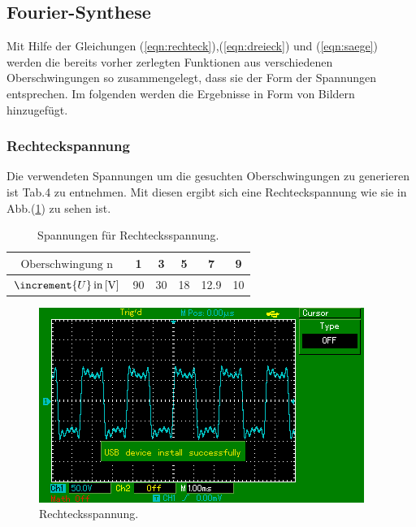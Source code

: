 \subsection{Fourier-Synthese}
Mit Hilfe der Gleichungen (\ref{eqn:rechteck}),(\ref{eqn:dreieck}) und (\ref{eqn:saege})
werden die bereits vorher zerlegten Funktionen aus verschiedenen Oberschwingungen so zusammengelegt,
dass sie der Form der Spannungen entsprechen. Im folgenden werden die Ergebnisse in Form von Bildern hinzugefügt.

\subsubsection{Rechteckspannung}
Die verwendeten Spannungen um die gesuchten Oberschwingungen zu generieren ist Tab.4 zu entnehmen.
Mit diesen ergibt sich eine Rechteckspannung wie sie in Abb.(\ref{fig:recht}) zu sehen ist.
\begin{table}[h]
  \centering
  \label{tab:4}
  \begin{tabular}{ c c c c c c  }
    \toprule
   $ \text{Oberschwingung n} $ & 1 & 3 & 5 & 7 & 9 \\
    \midrule
   $\increment{U} \,\text{in\,[V]}$ &90 & 30 &18 &12.9 & 10 \\
    \bottomrule
  \end{tabular}
  \caption{Spannungen für Rechtecksspannung.}
\end{table}
\begin{figure}[H]
  \centering
  \includegraphics{content/images/rechteck.png}
  \caption{Rechtecksspannung.}
  \label{fig:recht}
\end{figure}

